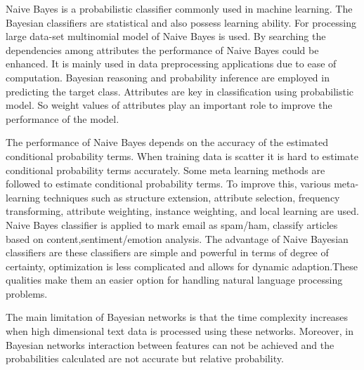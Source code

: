 Naive Bayes is a probabilistic classifier commonly used in machine learning. The Bayesian classifiers are statistical and also possess learning ability. For processing large data-set multinomial model of Naive Bayes is used. By searching the dependencies among attributes the performance of Naive Bayes could be enhanced. It is mainly used in data preprocessing applications due to ease of computation. Bayesian reasoning and probability inference are employed in predicting the target class. Attributes are key in classification using probabilistic model. So weight values of attributes play an important role to improve the performance of the model. %
\par
\vspace{0.5cm}
The performance of Naive Bayes depends on the accuracy of the estimated conditional probability terms. When training data is scatter it is hard to estimate conditional probability terms accurately. Some meta learning methods are followed to estimate conditional probability terms. To improve this, various meta-learning techniques such as structure extension, attribute selection, frequency transforming, attribute weighting, instance weighting, and local learning are used. Naive Bayes classifier is applied to mark email as spam/ham, classify articles based on content,sentiment/emotion analysis.%
The advantage of Naive Bayesian classifiers are these classifiers are simple and  powerful in terms of degree of certainty, optimization is less complicated and allows for dynamic adaption.These qualities  make them an easier option for handling natural language processing problems. \par
\vspace{.5cm}
The main limitation of Bayesian networks is that the time complexity increases when high dimensional text data is processed using these networks. Moreover, in Bayesian networks interaction between features can not be achieved and the probabilities calculated are not accurate but relative probability.

